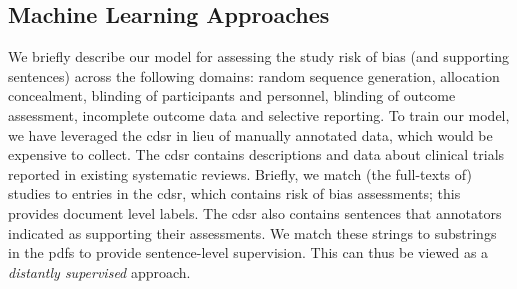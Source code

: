 \documentclass[runningheads,a4paper]{llncs}
\begin{document}

\subsection{Machine Learning Approaches}

We briefly describe our model for assessing the study risk of bias (and supporting sentences) across the following domains: random sequence generation, allocation concealment, blinding of participants and personnel, blinding of outcome assessment, incomplete outcome data and selective reporting.
To train our model, we have leveraged the \ac{cdsr} in lieu of manually annotated data, which would be expensive to collect.
The \ac{cdsr} contains descriptions and data about clinical trials reported in existing systematic reviews.
Briefly, we match (the full-texts of) studies to entries in the \ac{cdsr}, which contains risk of bias assessments; this provides document level labels.
The \ac{cdsr} also contains sentences that annotators indicated as supporting their assessments.
We match these strings to substrings in the \acp{pdf} to provide sentence-level supervision.
This can thus be viewed as a \emph{distantly supervised} \cite{mintz-09,nguyen-11} approach.
\end{document}
